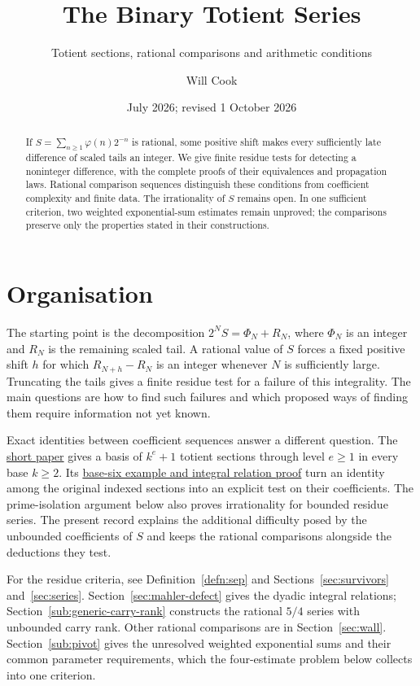 \documentclass[11pt]{article}
\title{The Binary Totient Series}
\subtitle{Totient sections, rational comparisons and arithmetic conditions}
\author{Will Cook}
\date{July 2026; revised 1 October 2026}
\theoremstyle{plain}
\theoremstyle{definition}
\theoremstyle{remark}
\newcommand{\shortpaper}[2]{\href{erdos-249-binary-totient-series.pdf\##1}{#2}}
\begin{document}
\maketitle

\paperprovenance

\begin{abstract}
If $S=\sum_{n\ge1}\varphi(n)2^{-n}$ is rational, some positive shift
makes every sufficiently late difference of scaled tails an integer.
We give finite residue tests for detecting a noninteger difference,
with the complete proofs of their equivalences and propagation laws.
Rational comparison sequences distinguish these conditions from
coefficient complexity and finite data. The irrationality of $S$
remains open. In one sufficient criterion, two weighted exponential-sum
estimates remain unproved; the comparisons preserve only the properties
stated in their constructions.
\end{abstract}

\section*{Organisation}
The starting point is the decomposition $2^NS=\Phi_N+R_N$, where
$\Phi_N$ is an integer and $R_N$ is the remaining scaled tail.
A rational value of $S$ forces a fixed positive shift $h$ for which
$R_{N+h}-R_N$ is an integer whenever $N$ is sufficiently large.
Truncating the tails gives a finite residue test for a failure of this
integrality. The main questions are how to find such failures and
which proposed ways of finding them require information not yet known.

Exact identities between coefficient sequences answer a different
question. The \shortpaper{short249-basis}{short paper} gives a basis
of $k^e+1$ totient sections through level $e\ge1$ in every base
$k\ge2$. Its
\shortpaper{short249-base-six}{base-six example and integral relation proof}
turn an identity among the original indexed sections into an explicit
test on their coefficients. The prime-isolation argument below also proves
irrationality for bounded residue series. The present record explains
the additional difficulty posed by the unbounded coefficients of $S$
and keeps the rational comparisons alongside the deductions they test.

For the residue criteria, see Definition~\ref{defn:sep} and
Sections~\ref{sec:survivors} and~\ref{sec:series}.
Section~\ref{sec:mahler-defect} gives the dyadic integral relations;
Section~\ref{sub:generic-carry-rank} constructs the rational $5/4$
series with unbounded carry rank. Other rational comparisons are in
Section~\ref{sec:wall}. Section~\ref{sub:pivot} gives the unresolved
weighted exponential sums and their common parameter requirements,
which the four-estimate problem below collects into one criterion.
\end{document}

